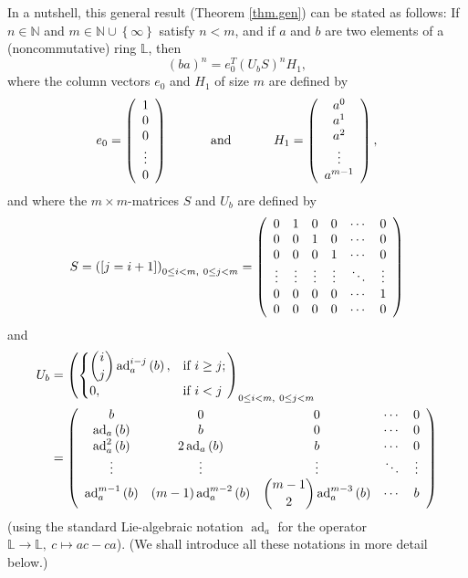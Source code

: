 \documentclass[numbers=enddot,12pt,final,onecolumn,notitlepage]{scrartcl}%
\theoremstyle{definition}
\begin{document}
In a nutshell, this general result (Theorem \ref{thm.gen}) can be stated as
follows: If $n\in\mathbb{N}$ and $m\in\mathbb{N}\cup\left\{  \infty\right\}  $
satisfy $n<m$, and if $a$ and $b$ are two elements of a (noncommutative) ring
$\mathbb{L}$, then%
\[
\left(  ba\right)  ^{n}=e_{0}^{T}\left(  U_{b}S\right)  ^{n}H_{1},
\]
where the column vectors $e_{0}$ and $H_{1}$ of size $m$ are defined by%
\[
e_{0}=\left(
\begin{array}
[c]{c}%
1\\
0\\
0\\
\vdots\\
0
\end{array}
\right)  \ \ \ \ \ \ \ \ \ \ \text{and}\ \ \ \ \ \ \ \ \ \ H_{1}=\left(
\begin{array}
[c]{c}%
a^{0}\\
a^{1}\\
a^{2}\\
\vdots\\
a^{m-1}%
\end{array}
\right)  ,
\]
and where the $m\times m$-matrices $S$ and $U_{b}$ are defined by%
\[
S=\left(  \left[  j=i+1\right]  \right)  _{0\leq i<m,\ 0\leq j<m}=\left(
\begin{array}
[c]{cccccc}%
0 & 1 & 0 & 0 & \cdots & 0\\
0 & 0 & 1 & 0 & \cdots & 0\\
0 & 0 & 0 & 1 & \cdots & 0\\
\vdots & \vdots & \vdots & \vdots & \ddots & \vdots\\
0 & 0 & 0 & 0 & \cdots & 1\\
0 & 0 & 0 & 0 & \cdots & 0
\end{array}
\right)
\]
and%
\begin{align*}
U_{b}  &  =\left(
\begin{cases}
\dbinom{i}{j}\operatorname*{ad}\nolimits_{a}^{i-j}\left(  b\right)  , &
\text{if }i\geq j;\\
0, & \text{if }i<j
\end{cases}
\right)  _{0\leq i<m,\ 0\leq j<m}\\
&  =\left(
\begin{array}
[c]{ccccc}%
b & 0 & 0 & \cdots & 0\\
\operatorname*{ad}\nolimits_{a}\left(  b\right)  & b & 0 & \cdots & 0\\
\operatorname*{ad}\nolimits_{a}^{2}\left(  b\right)  & 2\operatorname*{ad}%
\nolimits_{a}\left(  b\right)  & b & \cdots & 0\\
\vdots & \vdots & \vdots & \ddots & \vdots\\
\operatorname*{ad}\nolimits_{a}^{m-1}\left(  b\right)  & \left(  m-1\right)
\operatorname*{ad}\nolimits_{a}^{m-2}\left(  b\right)  & \dbinom{m-1}%
{2}\operatorname*{ad}\nolimits_{a}^{m-3}\left(  b\right)  & \cdots & b
\end{array}
\right)
\end{align*}
(using the standard Lie-algebraic notation $\operatorname*{ad}\nolimits_{a}$
for the operator $\mathbb{L}\rightarrow\mathbb{L},\ c\mapsto ac-ca$). (We
shall introduce all these notations in more detail below.)
\end{document}
